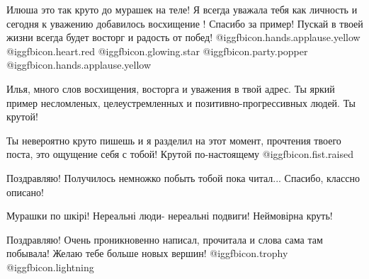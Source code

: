 \begin{itemize}
Илюша это так круто до мурашек на теле! Я всегда уважала тебя как личность и
сегодня к уважению добавилось восхищение ! Спасибо за пример! Пускай в твоей
жизни всегда будет восторг и радость от побед! @igg{fbicon.hands.applause.yellow} @igg{fbicon.heart.red} @igg{fbicon.glowing.star}  @igg{fbicon.party.popper}  @igg{fbicon.hands.applause.yellow} 


Илья, много слов восхищения, восторга и уважения в твой адрес. Ты яркий пример
несломленых, целеустремленных и позитивно-прогрессивных людей. Ты крутой!


Ты невероятно круто пишешь и я разделил на этот момент, прочтения твоего поста,
это ощущение себя с тобой! Крутой по-настоящему  @igg{fbicon.fist.raised} 

Поздравляю!
Получилось немножко побыть тобой пока читал... Спасибо, классно описано!

Мурашки по шкірі! Нереальні люди- нереальні подвиги!
Неймовірна круть!


Поздравляю! Очень проникновенно написал, прочитала и слова сама там побывала!
Желаю тебе больше новых вершин! @igg{fbicon.trophy} @igg{fbicon.lightning}

\end{itemize} %
